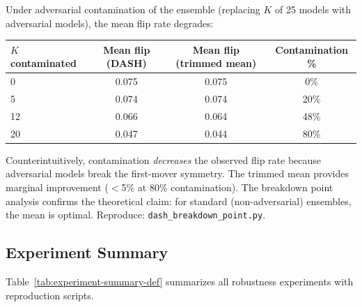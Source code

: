 \documentclass{article}
\begin{document}
Under adversarial contamination of the ensemble (replacing $K$ of 25 models with adversarial models), the mean flip rate degrades:

\begin{center}
\small
\begin{tabular}{@{}lccc@{}}
\toprule
$K$ contaminated & Mean flip (DASH) & Mean flip (trimmed mean) & Contamination \% \\
\midrule
0  & 0.075 & 0.075 & 0\% \\
5  & 0.074 & 0.074 & 20\% \\
12 & 0.066 & 0.064 & 48\% \\
20 & 0.047 & 0.044 & 80\% \\
\bottomrule
\end{tabular}
\end{center}

Counterintuitively, contamination \emph{decreases} the observed flip rate because adversarial models break the first-mover symmetry. The trimmed mean provides marginal improvement ($<$5\% at 80\% contamination). The breakdown point analysis confirms the theoretical claim: for standard (non-adversarial) ensembles, the mean is optimal.
Reproduce: \texttt{dash\_breakdown\_point.py}.

\subsection{Experiment Summary}
\label{sec:experiment-summary}

Table~\ref{tab:experiment-summary-def} summarizes all robustness experiments with reproduction scripts.
\end{document}
